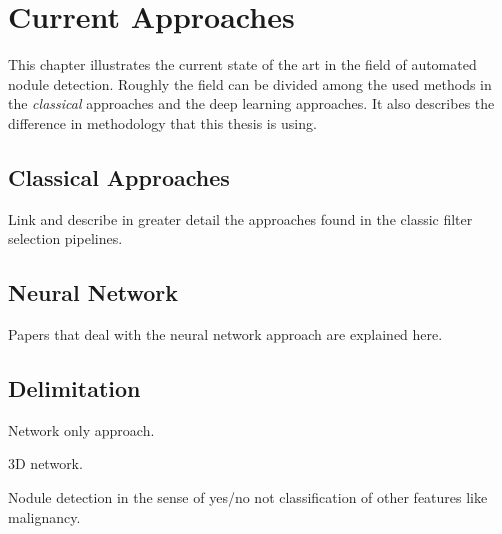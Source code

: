 \documentclass[main.tex]{subfiles}
\begin{document}
\chapter{Current Approaches}\label{chap:approaches}
This chapter illustrates the current state of the art in the field of automated nodule detection. Roughly the field can be divided among the used methods in the \emph{classical} approaches and the deep learning approaches. It also describes the difference in methodology that this thesis is using.

\section{Classical Approaches}
Link and describe in greater detail the approaches found in the classic filter selection pipelines.

\section{Neural Network}
Papers that deal with the neural network approach are explained here.

\section{Delimitation}
Network only approach.

3D network. 

Nodule detection in the sense of yes/no not classification of other features like malignancy.
\end{document}
